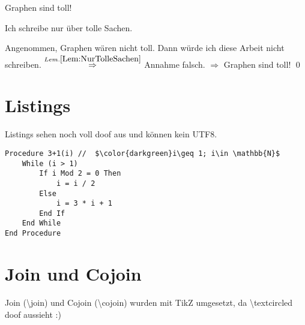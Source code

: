 \begin{Theorem}
Graphen sind toll!
\end{Theorem}

\begin{Lemma}\label{Lem:NurTolleSachen}
Ich schreibe nur über tolle Sachen.
\end{Lemma}

\begin{Proof}
Angenommen, Graphen wären nicht toll. Dann würde ich diese Arbeit nicht schreiben. $\overset{Lem. \ref{Lem:NurTolleSachen}}{\Rightarrow}$ Annahme falsch. $\Rightarrow$ Graphen sind toll! \qed
\end{Proof}


\section{Listings}
Listings sehen noch voll doof aus und können kein UTF8.
\begin{lstlisting}[caption={McGregor-Algorithmus},label={lst:McGregor}]
Procedure 3+1(i) //  $\color{darkgreen}i\geq 1; i\in \mathbb{N}$
    While (i > 1)
        If i Mod 2 = 0 Then
            i = i / 2
        Else
            i = 3 * i + 1
        End If
    End While
End Procedure
\end{lstlisting}





\section{Join und Cojoin}
Join (\textbackslash join) und Cojoin (\textbackslash cojoin) wurden mit TikZ umgesetzt, da \textbackslash textcircled doof aussieht :)

